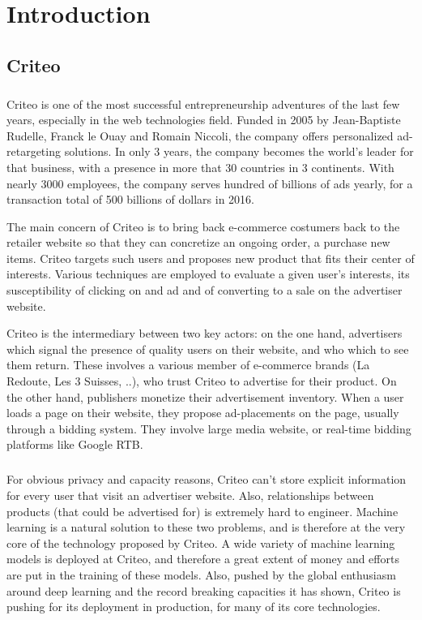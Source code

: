 \chapter{Introduction}
	{
		\section{Criteo}
		{
		
			\paragraph{} Criteo is one of the most successful entrepreneurship adventures of the last few years, especially in the web technologies field. Funded in 2005 by Jean-Baptiste Rudelle, Franck le Ouay and Romain Niccoli, the company offers personalized ad-retargeting solutions. In only 3 years, the company becomes the world's leader for that business, with a presence in more that 30 countries in 3 continents. With nearly 3000 employees, the company serves hundred of billions of ads yearly, for a transaction total of 500 billions of dollars in 2016. 
			
			The main concern of Criteo is to bring back e-commerce costumers back to the retailer website so that they can concretize an ongoing order, a purchase new items. Criteo targets such users and proposes new product that fits their center of interests. Various techniques are employed to evaluate a given user's interests, its susceptibility of clicking on and ad and of converting to a sale on the advertiser website. 
			
			Criteo is the intermediary between two key actors: on the one hand, advertisers which signal the presence of quality users on their website, and who which to see them return. These involves a various member of e-commerce brands (La Redoute, Les 3 Suisses, ..), who trust Criteo to advertise for their product. On the other hand, publishers monetize their advertisement inventory. When a user loads a page on their website, they propose ad-placements on the page, usually through a bidding system. They involve large media website, or real-time bidding platforms like Google RTB. 
			
			\paragraph{} For obvious privacy and capacity reasons, Criteo can't store explicit information for every user that visit an advertiser website. Also, relationships between products (that could be advertised for) is extremely hard to engineer. Machine learning is a natural solution to these two problems, and is therefore at the very core of the technology proposed by Criteo. A wide variety of machine learning models is deployed at Criteo, and therefore a great extent of money and efforts are put in the training of these models. Also, pushed by the global enthusiasm around deep learning and the record breaking capacities it has shown, Criteo is pushing for its deployment in production, for many of its core technologies. 

}}
